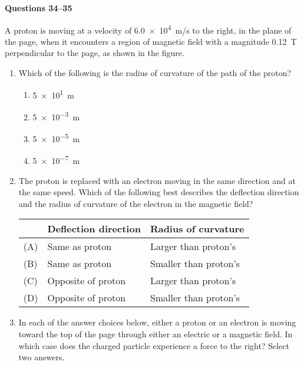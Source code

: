 \documentclass{../../oss-apphys}
\begin{document}
\begin{multicols}{2}
  \columnbreak

  \textbf{Questions 34--35}

  \begin{center}
  \end{center}
  A proton is moving at a velocity of \SI{6.0e4}{m/s} to the right, in the
  plane of the page, when it encounters a region of magnetic field with a
  magnitude \SI{0.12}{\tesla} perpendicular to the page, as shown in the
  figure.

  \begin{enumerate}[leftmargin=18pt,resume]
  \item Which of the following is the radius of curvature of the path of the
    proton?
    \begin{enumerate}[noitemsep,topsep=0pt,leftmargin=18pt,label=(\Alph*)]
    \item\SI{5e1}{\metre}
    \item\SI{5e-3}{\metre}
    \item\SI{5e-5}{\metre}
    \item\SI{5e-7}{\metre}
    \end{enumerate}

  \item The proton is replaced with an electron moving in the same direction
    and at the same speed. Which of the following best describes the
    deflection direction and the radius of curvature of the electron in the
    magnetic field?

    \begin{tabular}{lll}
      & \textbf{Deflection direction} & \textbf{Radius of curvature} \\
      \hline
      (A) & Same as proton & Larger than proton's \\
      (B) & Same as proton & Smaller than proton's \\
      (C) & Opposite of proton & Larger than proton's \\
      (D) & Opposite of proton & Smaller than proton's
    \end{tabular}

  \item In each of the answer choices below, either a proton or an electron is
    moving toward the top of the page through either an electric or a
    magnetic field. In which case does the charged particle experience a
    force to the right? Select two answers.


\end{enumerate}
\end{multicols}
\end{document}
